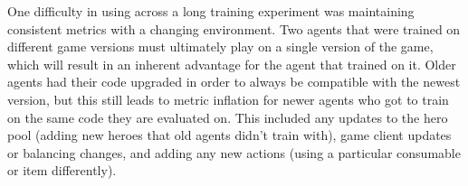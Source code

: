 \documentclass[ocean-paper.tex]{subfiles}
\begin{document}
One difficulty in using \trueskillname across a long training experiment was maintaining consistent metrics with a changing environment. 
Two agents that were trained on different game versions must ultimately play on a single version of the game, which will result in an inherent advantage for the agent that trained on it. 
Older agents had their code upgraded in order to always be compatible with the newest version, but this still leads to metric inflation for newer agents who got to train on the same code they are evaluated on. 
This included any updates to the hero pool (adding new heroes that old agents didn't train with), game client updates or balancing changes, and adding any new actions (using a particular consumable or item differently).
\end{document}
